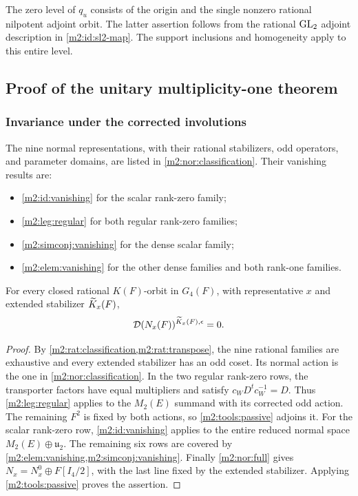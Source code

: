 \begin{remark}\label{m2:id:nilpotent-remark}
The zero level of $q_u$ consists of the origin and the single nonzero
rational nilpotent adjoint orbit. The latter assertion follows from
the rational $\operatorname{GL}_2$ adjoint description in \eqref{m2:id:sl2-map}.
The support inclusions and homogeneity apply to this entire level.
\end{remark}

\subsection{Proof of the unitary multiplicity-one theorem}
\label{m2:sec:completion}

\subsubsection{Invariance under the corrected involutions}

The nine normal representations, with their rational stabilizers,
odd operators, and parameter domains, are listed in
\cref{m2:nor:classification}. Their vanishing results are:
\begin{itemize}
\item \cref{m2:id:vanishing} for the scalar rank-zero family;
\item \cref{m2:leg:regular} for both regular rank-zero families;
\item \cref{m2:simconj:vanishing} for the dense scalar family;
\item \cref{m2:elem:vanishing} for the other dense families and both
rank-one families.
\end{itemize}

\begin{proposition}\label{m2:completion:normal-vanishing}
For every closed rational $K(F)$-orbit in $G_4(F)$, with
representative $x$ and extended stabilizer $\widetilde K_x(F)$,
\[
 \mathcal D(N_x(F))^{\widetilde K_x(F),\epsilon}=0.
\]
\end{proposition}

\begin{proof}
By \cref{m2:rat:classification,m2:rat:transpose}, the nine rational
families are exhaustive and every extended stabilizer has an odd
coset. Its normal action is the one in \cref{m2:nor:classification}.
In the two regular rank-zero rows, the transporter factors have
equal multipliers and satisfy $c_WD^tc_W^{-1}=D$. Thus
\cref{m2:leg:regular} applies to the $M_2(E)$ summand with its
corrected odd action. The remaining $F^2$ is fixed by both actions,
so \cref{m2:tools:passive} adjoins it. For the scalar rank-zero
row, \cref{m2:id:vanishing} applies to the entire reduced normal space
$M_2(E)\oplus\mathfrak u_2$. The remaining six rows are covered by
\cref{m2:elem:vanishing,m2:simconj:vanishing}.
Finally \cref{m2:nor:full} gives
$N_x=N_x^0\oplus F[I_4/2]$, with the last line fixed by the
extended stabilizer. Applying \cref{m2:tools:passive} proves the assertion.
\end{proof}

